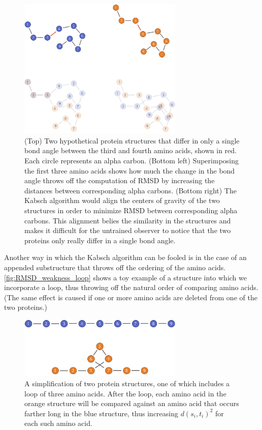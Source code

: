 \begin{figure}[h]
	\centering
	\mySfFamily
	\includegraphics[width = 0.7\textwidth]{../images/RMSD_weakness_mutation.png}
	\caption{(Top) Two hypothetical protein structures that differ in only a single bond angle between the third and fourth amino acids, shown in red. Each circle represents an alpha carbon. (Bottom left) Superimposing the first three amino acids shows how much the change in the bond angle throws off the computation of RMSD by increasing the distances between corresponding alpha carbons. (Bottom right) The Kabsch algorithm would align the centers of gravity of the two structures in order to minimize RMSD between corresponding alpha carbons. This alignment belies the similarity in the structures and makes it difficult for the untrained observer to notice that the two proteins only really differ in a single bond angle.}
	\label{fig:RMSD_weakness_mutation}
\end{figure}

Another way in which the Kabsch algorithm can be fooled is in the case of an appended substructure that throws off the ordering of the amino acids. \autoref{fig:RMSD_weakness_loop} shows a toy example of a structure into which we incorporate a loop, thus throwing off the natural order of comparing amino acids. (The same effect is caused if one or more amino acids are deleted from one of the two proteins.)

\begin{figure}[h]
	\centering
	\mySfFamily
	\includegraphics[width = 0.7\textwidth]{../images/RMSD_weakness_loop.png}
	\caption{A simplification of two protein structures, one of which includes a loop of three amino acids. After the loop, each amino acid in the orange structure will be compared against an amino acid that occurs farther long in the blue structure, thus increasing $d(s_{i}, t_{i})^2$ for each such amino acid.}
	\label{fig:RMSD_weakness_loop}
\end{figure}

